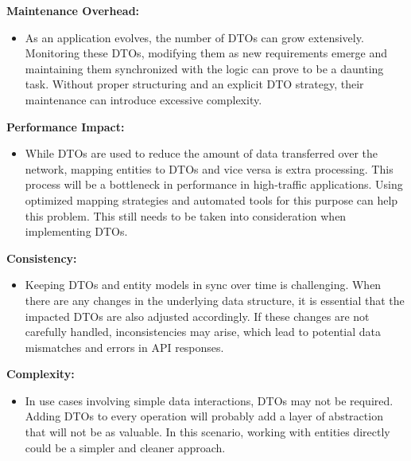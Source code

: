     \textbf{Maintenance Overhead:}
    \begin{itemize}
        \item As an application evolves, the number of DTOs can grow extensively. Monitoring these DTOs, modifying them as new requirements emerge and maintaining them synchronized with the logic can prove to be a daunting task. Without proper structuring and an explicit DTO strategy, their maintenance can introduce excessive complexity.
    \end{itemize}
    \textbf{Performance Impact:}
    \begin{itemize}
        \item While DTOs are used to reduce the amount of data transferred over the network, mapping entities to DTOs and vice versa is extra processing. This process will be a bottleneck in performance in high-traffic applications. Using optimized mapping strategies and automated tools for this purpose can help this problem. This still needs to be taken into consideration when implementing DTOs.
    \end{itemize}
    \textbf{Consistency:}
    \begin{itemize}
        \item Keeping DTOs and entity models in sync over time is challenging. When there are any changes in the underlying data structure, it is essential that the impacted DTOs are also adjusted accordingly. If these changes are not carefully handled, inconsistencies may arise, which lead to potential data mismatches and errors in API responses.
    \end{itemize}
    \textbf{Complexity:}
    \begin{itemize}
        \item In use cases involving simple data interactions, DTOs may not be required. Adding DTOs to every operation will probably add a layer of abstraction that will not be as valuable. In this scenario, working with entities directly could be a simpler and cleaner approach.
    \end{itemize} \Autocite{Andi:DTOs}

    \pagebreak